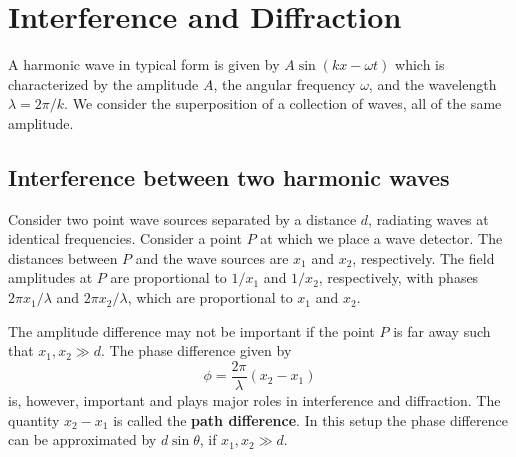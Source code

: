 \documentclass[12pt, a4paper, oneside, openright, titlepage]{book}
\begin{document}
\section{Interference and Diffraction}



A harmonic wave in typical form is given by $A\sin(kx-\omega t)$ which is characterized by the amplitude $A$, the angular frequency $\omega$, and the wavelength $\lambda = 2\pi/k$. We consider the superposition of a collection of waves, all of the same amplitude. 


\subsection{Interference between two harmonic waves}


Consider two point wave sources separated by a distance $d$, radiating waves at identical frequencies. Consider a point $P$ at which we place a wave detector. The distances between $P$ and the wave sources are $x_1$ and $x_2$, respectively. The field amplitudes at $P$ are proportional to $1/x_1$ and $1/x_2$, respectively, with phases $2\pi x_1/\lambda$ and $2\pi x_2/\lambda$, which are proportional to $x_1$ and $x_2$.


The amplitude difference may not be important if the  point $P$ is far away such that $x_1,x_2 \gg d$. The phase difference given by
\begin{equation*}
    \phi = \frac{2\pi}{\lambda}(x_2-x_1)
\end{equation*}
is, however, important and plays major roles in interference and diffraction. The quantity $x_2-x_1$ is called the \textbf{path difference}. In this setup the phase difference can be approximated by $d\sin\theta$, if $x_1,x_2\gg d$. 
\end{document}
